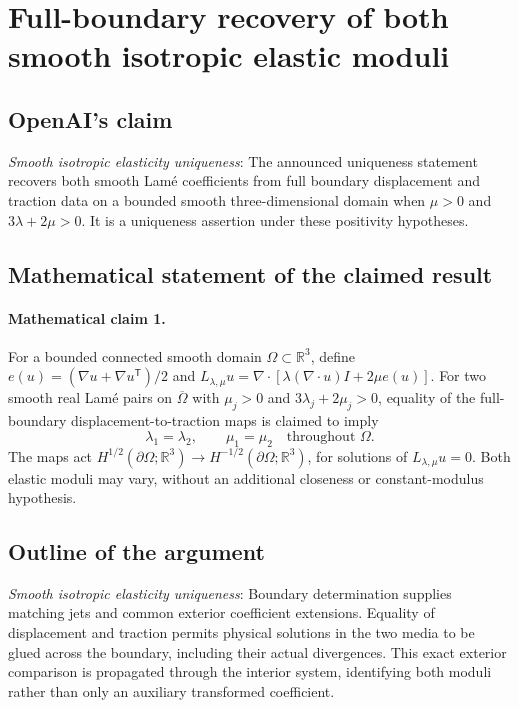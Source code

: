 \documentclass[11pt]{article}
\begin{document}
\section*{Full-boundary recovery of both smooth isotropic elastic moduli}

\subsection{OpenAI's claim}
\textit{Smooth isotropic elasticity uniqueness}: The announced uniqueness statement recovers both smooth Lamé coefficients from full boundary displacement and traction data on a bounded smooth three-dimensional domain when $\mu>0$ and $3\lambda+2\mu>0$. It is a uniqueness assertion under these positivity hypotheses.

\subsection{Mathematical statement of the claimed result}
\paragraph{Mathematical claim 1.} For a bounded connected smooth domain $\Omega\subset\mathbb R^3$, define $e(u)=(\nabla u+\nabla u^{\mathsf T})/2$ and $L_{\lambda,\mu}u=\nabla\cdot[\lambda(\nabla\cdot u)I+2\mu e(u)]$. For two smooth real Lam\'e pairs on $\overline\Omega$ with $\mu_j>0$ and $3\lambda_j+2\mu_j>0$, equality of the full-boundary displacement-to-traction maps is claimed to imply \[\lambda_1=\lambda_2,\qquad\mu_1=\mu_2\quad\text{throughout }\Omega.\] The maps act $H^{1/2}(\partial\Omega;\mathbb R^3)\to H^{-1/2}(\partial\Omega;\mathbb R^3)$, for solutions of $L_{\lambda,\mu}u=0$. Both elastic moduli may vary, without an additional closeness or constant-modulus hypothesis.

\subsection{Outline of the argument}
\textit{Smooth isotropic elasticity uniqueness}: Boundary determination supplies matching jets and common exterior coefficient extensions. Equality of displacement and traction permits physical solutions in the two media to be glued across the boundary, including their actual divergences. This exact exterior comparison is propagated through the interior system, identifying both moduli rather than only an auxiliary transformed coefficient.
\end{document}

